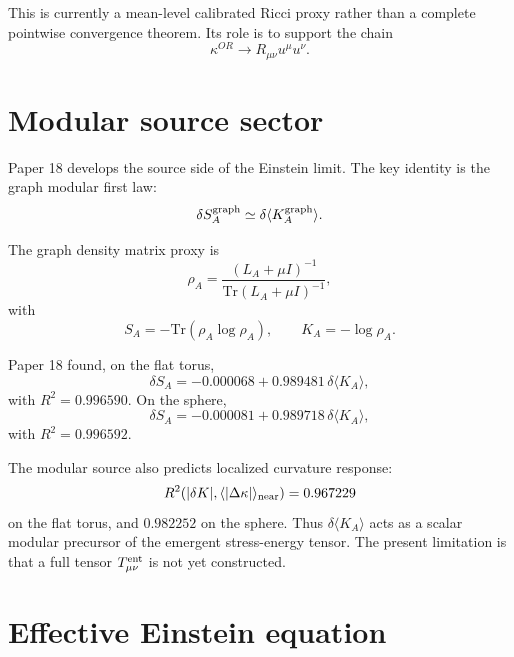 \documentclass[11pt,a4paper]{article}
\begin{document}
This is currently a mean-level calibrated Ricci proxy rather than a complete
pointwise convergence theorem. Its role is to support the chain
\begin{equation}
  \kappa^{OR}\to R_{\mu\nu}u^\mu u^\nu.
\end{equation}

\section{Modular source sector}

Paper 18 develops the source side of the Einstein limit. The key identity is
the graph modular first law:
\begin{equation}
  \delta S_A^{\rm graph}
  \simeq
  \delta\langle K_A^{\rm graph}\rangle.
\end{equation}

The graph density matrix proxy is
\begin{equation}
  \rho_A
  =
  \frac{(L_A+\mu I)^{-1}}
  {\mathrm{Tr}(L_A+\mu I)^{-1}},
\end{equation}
with
\begin{equation}
  S_A=-\mathrm{Tr}(\rho_A\log\rho_A),
  \qquad
  K_A=-\log\rho_A.
\end{equation}

Paper 18 found, on the flat torus,
\begin{equation}
  \delta S_A
  =
  -0.000068
  +
  0.989481\,\delta\langle K_A\rangle,
\end{equation}
with \(R^2=0.996590\). On the sphere,
\begin{equation}
  \delta S_A
  =
  -0.000081
  +
  0.989718\,\delta\langle K_A\rangle,
\end{equation}
with \(R^2=0.996592\).

The modular source also predicts localized curvature response:
\begin{equation}
  R^2(|\delta K|,\langle|\Delta\kappa|\rangle_{\rm near})
  =
  0.967229
\end{equation}
on the flat torus, and \(0.982252\) on the sphere. Thus
\(\delta\langle K_A\rangle\) acts as a scalar modular precursor of the emergent
stress-energy tensor. The present limitation is that a full tensor
\(T_{\mu\nu}^{\rm ent}\) is not yet constructed.

\section{Effective Einstein equation}
\end{document}
